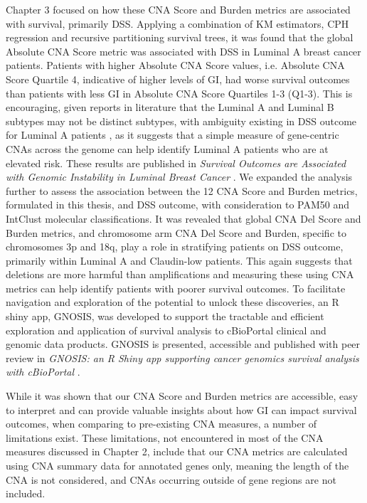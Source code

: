 Chapter 3 focused on how these CNA Score and Burden metrics are associated with survival, primarily DSS. Applying a combination of KM estimators, CPH regression and recursive partitioning survival trees, it was found that the global Absolute CNA Score metric was associated with DSS in Luminal A breast cancer patients. Patients with higher Absolute CNA Score values, i.e. Absolute CNA Score Quartile 4, indicative of higher levels of GI, had worse survival outcomes than patients with less GI in Absolute CNA Score Quartiles 1-3 (Q1-3). This is encouraging, given reports in literature that the Luminal A and Luminal B subtypes may not be distinct subtypes, with ambiguity existing in DSS outcome for Luminal A patients \citep{pmid27341628, pmid26679376, pmid30849944, pmid37253056}, as it suggests that a simple measure of gene-centric CNAs across the genome can help identify Luminal A patients who are at elevated risk. These results are published in \textit{Survival Outcomes are Associated with Genomic Instability in Luminal Breast Cancer} \citep{King_2021}. We expanded the analysis further to assess the association between the 12 CNA Score and Burden metrics, formulated in this thesis, and DSS outcome, with consideration to PAM50 and IntClust molecular classifications. It was revealed that global CNA Del Score and Burden metrics, and chromosome arm CNA Del Score and Burden, specific to chromosomes 3p and 18q, play a role in stratifying patients on DSS outcome, primarily within Luminal A and Claudin-low patients. This again suggests that deletions are more harmful than amplifications and measuring these using CNA metrics can help identify patients with poorer survival outcomes. To facilitate navigation and exploration of the potential to unlock these discoveries, an R shiny app, GNOSIS, was developed to support the tractable and efficient exploration and application of survival analysis to cBioPortal clinical and genomic data products. GNOSIS is presented, accessible and published with peer review in \textit{GNOSIS: an R Shiny app supporting cancer genomics survival analysis with cBioPortal} \citep{King_GNOSIS}. 

While it was shown that our CNA Score and Burden metrics are accessible, easy to interpret and can provide valuable insights about how GI can impact survival outcomes, when comparing to pre-existing CNA measures, a number of limitations exist. These limitations, not encountered in most of the CNA measures discussed in Chapter 2, include that our CNA metrics are calculated using CNA summary data for annotated genes only, meaning the length of the CNA is not considered, and CNAs occurring outside of gene regions are not included.  


